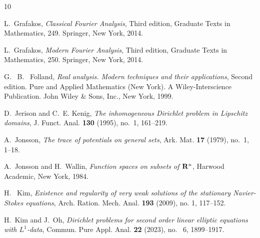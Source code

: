 \documentclass[reqno,centertags,11pt]{amsart}
\theoremstyle{definition}
\numberwithin{thm}{section}
\numberwithin{equation}{section}
\begin{document}
\begin{thebibliography}{10}


L.~Grafakos, \emph{Classical Fourier Analysis}, Third edition, Graduate Texts in Mathematics, 249. Springer, New York, 2014.

L.~Grafakos, \emph{Modern Fourier Analysis}, Third edition, Graduate Texts in Mathematics, 250. Springer, New York, 2014.

G. ~B. ~Folland,
\emph{Real analysis. Modern techniques and their applications}, Second edition.
Pure and Applied Mathematics (New York). A Wiley-Interscience Publication. John Wiley \& Sons, Inc., New York, 1999.


D.~Jerison and C.~E. Kenig, \emph{The inhomogeneous {D}irichlet problem in
  {L}ipschitz domains}, J. Funct. Anal. \textbf{130} (1995), no.~1, 161--219.

A.~Jonsson, \emph{The trace of potentials on general sets}, Ark. Mat.
  \textbf{17} (1979), no.~1, 1--18.

A.~Jonsson and H.~Wallin, \emph{Function spaces on subsets of {${\bf R}^n$}},
  Harwood Academic, New York, 1984.


H. ~Kim, \emph{Existence and regularity of very weak solutions of the stationary Navier-Stokes equations}, Arch. Ration. Mech. Anal. \textbf{193} (2009), no. 1, 117--152.





H.~Kim and J.~Oh, \emph{Dirichlet problems for second order linear elliptic equations with $L^{1}$-data},  Commun. Pure Appl. Anal. \textbf{22} (2023), no. ~6, 1899--1917.



\end{thebibliography}
\end{document}
